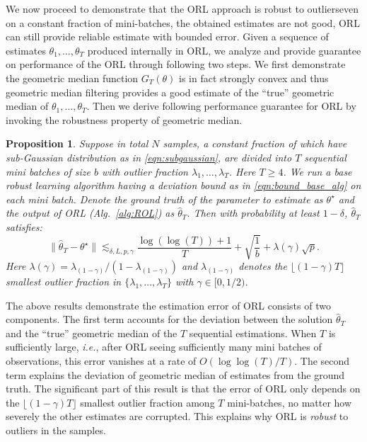 \documentclass[11pt]{article}
\newtheorem{proposition}{Proposition}
\begin{document}
We now proceed to demonstrate that the ORL approach is robust to outliers\textemdash even on a constant fraction of mini-batches, the obtained estimates are not good, ORL can still provide reliable estimate with bounded error.  Given a sequence of estimates $\theta_1,\ldots,\theta_T$ produced internally in ORL,  we analyze and provide guarantee on performance of the ORL through following two steps. We first demonstrate the geometric median function $ G_T(\theta) $ is in fact strongly convex and thus geometric median filtering  provides a good estimate of the ``true'' geometric median of $\theta_1, \ldots, \theta_T$. Then we  derive following performance guarantee for ORL by invoking the robustness property of geometric median.
\begin{proposition}%
	\label{prop:rol}
	Suppose  in total $ N $ samples, a constant fraction of  which have sub-Gaussian distribution as in \eqref{eqn:subgaussian}, are divided into $ T $ sequential mini batches of size $b$ with outlier fraction $\lambda_1,\ldots,\lambda_T$. Here $ T \geq 4 $.   We run a  base robust learning algorithm having a deviation bound as in \eqref{eqn:bound_base_alg} on each mini batch. Denote the ground truth of the parameter to estimate as $ \theta^\star $ and the output of ORL (Alg.~\ref{alg:ROL}) as $ \widehat{\theta}_T $. Then with probability at least $1-\delta$, $ \widehat{\theta}_T $ satisfies:
	\begin{equation*}
	\|\widehat{\theta}_T - \theta^\star\| \lesssim_{\delta,L, p, \gamma}  \frac{ \log(\log(T))+1}{T} +  \sqrt{\frac{1}{b}} +  \lambda(\gamma)\sqrt{p}.
	\end{equation*}
	Here $\lambda(\gamma)=\lambda_{(1-\gamma)}/(1-\lambda_{(1-\gamma)})$  and  $\lambda_{(1-\gamma)}$ denotes the $ \lfloor (1-\gamma) T \rfloor $ smallest outlier fraction in $ \{\lambda_1,\ldots,\lambda_T\} $ with $ \gamma \in [0,1/2) $.
\end{proposition}
The above results demonstrate the estimation error  of ORL consists of two components. The first term accounts for the deviation between the solution $ \widehat{\theta}_T $ and the ``true'' geometric median of the $T$ sequential estimations. When $ T$ is sufficiently large, \emph{i.e.}, after ORL seeing sufficiently many mini batches of observations, this error vanishes at a rate of $ O(\log\log(T)/T) $. The second term explains the deviation of geometric median of estimates from the ground truth. The significant part of this result is that the error of ORL only depends on the $\lfloor (1-\gamma) T \rfloor$ smallest outlier fraction among $ T $ mini-batches, no matter how severely the other estimates are corrupted. This explains why ORL is \emph{robust} to outliers in the samples.
\end{document}
